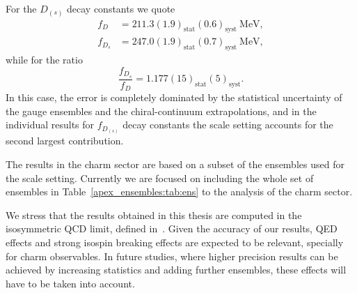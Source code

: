For the $D_{(s)}$ decay constants we quote
\begin{align}
	f_D &= 211.3(1.9)_{\textrm{stat}}(0.6)_{\textrm{syst}} \ \mathrm{MeV},
	\\
	f_{D_s} &= 247.0(1.9)_{\textrm{stat}}(0.7)_{\textrm{syst}} \ \mathrm{MeV},
\end{align}
while for the ratio
\begin{equation}
	\frac{f_{D_s}}{f_D} = 1.177(15)_{\textrm{stat}}(5)_{\textrm{syst}}.
\end{equation}
In this case, the error is completely dominated by the statistical uncertainty of the gauge ensembles and the chiral-continuum extrapolations, and in the individual results for $f_{D_{(s)}}$ decay constants the scale setting accounts for the second largest contribution.

The results in the charm sector are based on a subset of the ensembles used for the scale setting. Currently we are focused on including the whole set of ensembles in Table~\ref{apex_ensembles:tab:ens} to the analysis of the charm sector.

We stress that the results obtained in this thesis are computed in the isosymmetric QCD limit, defined in~\citep{FlavourLatticeAveragingGroupFLAG:2021npn}. Given the accuracy of our results, QED effects and strong isospin breaking effects are expected to be relevant, specially for charm observables. In future studies, where higher precision results can be achieved by increasing statistics and adding further ensembles, these effects will have to be taken into account.

